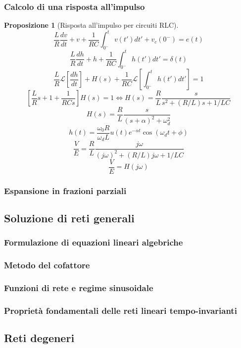 \documentclass[a4paper,12pt]{article}
\theoremstyle{mystyle}
\newtheorem{proposition}[theorem]{Proposizione}
\begin{document}
\subsubsection{Calcolo di una risposta all'impulso}
\begin{proposition}[Risposta all'impulso per circuiti RLC]
    \[\frac{L}{R} \frac{d v}{dt} + v + \frac{1}{RC} \int_{0^-}^{t} v(t') dt' + v_c (0^-) = e(t)\]
    \[\frac{L}{R} \frac{d h}{dt} + h + \frac{1}{RC} \int_{0^-}^{t} h(t') dt' = \delta(t)\]
    \[\frac{L}{R} \mathcal{L} \left[\frac{dh}{dt}\right] + H(s) + \frac{1}{RC} \mathcal{L} \left[ \int_{0^-}^{t} h(t') dt'\right] = 1\]
    \[\left[ \frac{L}{R} s + 1 + \frac{1}{RCs} \right] H(s) = 1 \Leftrightarrow H(s) = \frac{R}{L} \frac{s}{s^2 + (R/L)s + 1/LC}\]
    \[H(s) = \frac{R}{L} \frac{s}{(s+ \alpha)^2 + \omega _d ^2}\]
    \[h(t) = \frac{\omega _0 R}{\omega _d L} u(t) e^{-\alpha t} \cos (\omega _d t + \phi)\]
    \[\frac{V}{E} = \frac{R}{L} \frac{j \omega}{(j \omega)^2 + (R/L) j \omega + 1/LC}\]
    \[\frac{V}{E} = H(j \omega)\]
\end{proposition}

\subsubsection{Espansione in frazioni parziali}

\subsection{Soluzione di reti generali}
\subsubsection{Formulazione di equazioni lineari algebriche}
\subsubsection{Metodo del cofattore}
\subsubsection{Funzioni di rete e regime sinusoidale}
\subsubsection{Proprietà fondamentali delle reti lineari tempo-invarianti}

\subsection{Reti degeneri}
\end{document}
